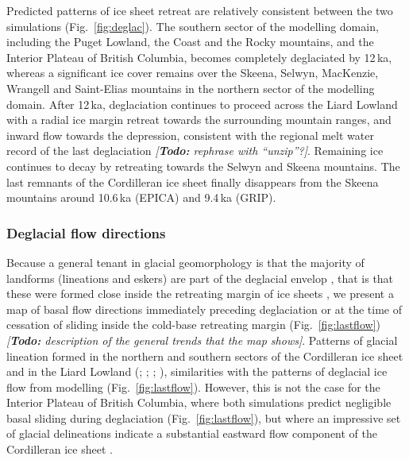 \documentclass[tc, manuscript]{copernicus}
\newcommand{\todo}[1]{\emph{[\textbf{Todo:} #1]}}
\begin{document}
Predicted patterns of ice sheet retreat are relatively consistent between the
two simulations (Fig.~\ref{fig:deglac}). The southern sector of the modelling
domain, including the Puget Lowland, the Coast and the Rocky mountains, and the
Interior Plateau of British Columbia, becomes completely deglaciated by 12\,ka,
whereas a significant ice cover remains over the Skeena, Selwyn, MacKenzie,
Wrangell and Saint-Elias mountains in the northern sector of the modelling
domain. After 12\,ka, deglaciation continues to proceed across the Liard
Lowland with a radial ice margin retreat towards the surrounding mountain
ranges, and inward flow towards the depression, consistent with the regional
melt water record of the last deglaciation \citep{Margold.etal.2013}
\todo{rephrase with ``unzip''?}. Remaining ice continues to decay by retreating
towards the Selwyn and Skeena mountains. The last remnants of the Cordilleran
ice sheet finally disappears from the Skeena mountains around 10.6\,ka (EPICA)
and 9.4\,ka (GRIP).

\subsubsection{Deglacial flow directions}

Because a general tenant in glacial geomorphology is that the majority of
landforms (lineations and eskers) are part of the deglacial envelop
\citep[terminology from]{Kleman.etal.2006}, that is that these were formed
close inside the retreating margin of ice sheets \citep{Boulton.Clark.1990,
Kleman.etal.1997, Kleman.etal.2010}, we present a map of basal flow directions
immediately preceding deglaciation or at the time of cessation of sliding
inside the cold-base retreating margin (Fig.~\ref{fig:lastflow})
\todo{description of the general trends that the map shows}. Patterns of
glacial lineation formed in the northern and southern sectors of the
Cordilleran ice sheet and in the Liard Lowland (\citealp{Prest.etal.1968};
\citealp[Fig.~1.12]{Clague.1989}; \citealp[Fig.~2]{Kleman.etal.2010};
\citealp[Fig.~2]{Margold.etal.2013}), similarities with the patterns of
deglacial ice flow from modelling (Fig.~\ref{fig:lastflow}). However, this is
not the case for the Interior Plateau of British Columbia, where both
simulations predict negligible basal sliding during deglaciation
(Fig.~\ref{fig:lastflow}), but where an impressive set of glacial delineations
indicate a substantial eastward flow component of the Cordilleran ice sheet
\citep{Prest.etal.1968, Kleman.etal.2010}.
\end{document}
